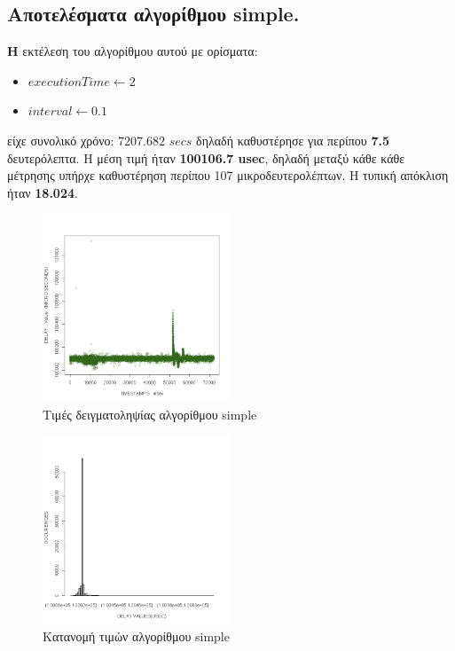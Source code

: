 \documentclass[12pt, a4paper]{article}
\begin{document}
\subsection{Αποτελέσματα αλγορίθμου \textlatin{simple}.}
\justify
\textbf{H} εκτέλεση του αλγορίθμου αυτού με ορίσματα:
\begin{itemize}
    \item $executionTime \longleftarrow 2$
    \item $interval \longleftarrow 0.1$
\end{itemize}
είχε συνολικό χρόνο: $7207.682$ $secs$ δηλαδή καθυστέρησε για περίπου \textbf{7.5} δευτερόλεπτα. Η μέση τιμή ήταν \textbf{100106.7 \textlatin{usec}}, δηλαδή μεταξύ κάθε κάθε μέτρησης υπήρχε καθυστέρηση περίπου 107 μικροδευτερολέπτων. Η τυπική απόκλιση ήταν \textbf{18.024}.

\begin{figure}[h]
\caption{Τιμές δειγματοληψίας αλγορίθμου \textlatin{simple}}
\centering
\includegraphics[width=0.5\textwidth]{images/simple.png}
\end{figure}
\begin{figure}[h]
\caption{Κατανομή τιμών αλγορίθμου \textlatin{simple}}
\centering
\includegraphics[width=0.5\textwidth]{images/simple_distribution.png}
\end{figure}
\end{document}
